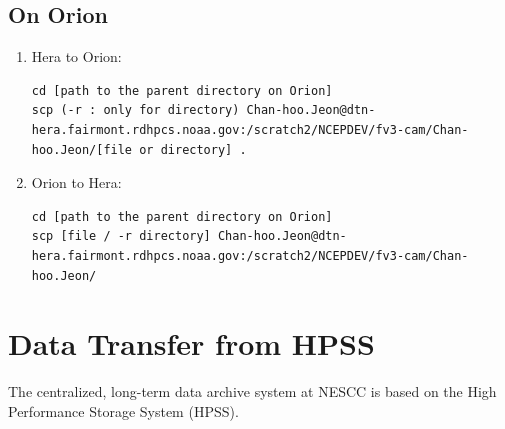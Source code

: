 \documentclass[11pt,fleqn]{report}              %
\begin{document}
\subsection{On Orion}
\begin{enumerate}
\item Hera to Orion:
\lstset{language=bash}   
\begin{lstlisting}[frame=trBL]
cd [path to the parent directory on Orion]
scp (-r : only for directory) Chan-hoo.Jeon@dtn-hera.fairmont.rdhpcs.noaa.gov:/scratch2/NCEPDEV/fv3-cam/Chan-hoo.Jeon/[file or directory] .
\end{lstlisting}

\item Orion to Hera:
\lstset{language=bash}   
\begin{lstlisting}[frame=trBL]
cd [path to the parent directory on Orion]
scp [file / -r directory] Chan-hoo.Jeon@dtn-hera.fairmont.rdhpcs.noaa.gov:/scratch2/NCEPDEV/fv3-cam/Chan-hoo.Jeon/
\end{lstlisting}

\end{enumerate}




\section{Data Transfer from HPSS}
\label{sec:data_from_hpss}

The centralized, long-term data archive system at NESCC is based on the High Performance Storage System (HPSS).
\end{document}
